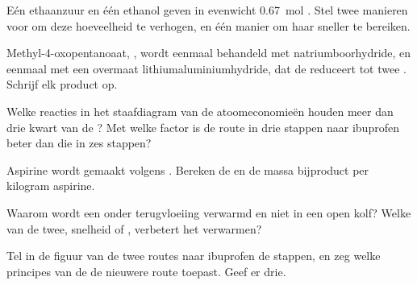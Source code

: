 \begin{exercise}[$\star\star$]\label{exo:g12:synthesis-strategy:6}
Eén  ethaanzuur en één  ethanol geven in evenwicht
\qty{0.67}{mol} . Stel twee manieren voor om deze hoeveelheid te
verhogen, en één manier om haar sneller te bereiken.
\end{exercise}

\begin{exercise}[$\star\star$]\label{exo:g12:synthesis-strategy:7}
Methyl-4-oxopentanoaat, , wordt eenmaal
behandeld met natriumboorhydride, en eenmaal met een overmaat
lithiumaluminiumhydride, dat de  reduceert tot twee .
Schrijf elk product op.
\end{exercise}

\begin{exercise}[$\star\star$]\label{exo:g12:synthesis-strategy:8}
Welke reacties in het staafdiagram van de atoomeconomieën houden meer dan
drie kwart van de ? Met welke factor is de route in drie stappen
naar ibuprofen beter dan die in zes stappen?
\end{exercise}

\begin{exercise}[$\star\star$]\label{exo:g12:synthesis-strategy:9}
Aspirine wordt gemaakt volgens .
Bereken de  en de massa bijproduct per kilogram aspirine.
\end{exercise}

\begin{exercise}[$\star\star$]\label{exo:g12:synthesis-strategy:10}
Waarom wordt een  onder terugvloeiing verwarmd en niet in een open
kolf? Welke van de twee, snelheid of , verbetert het verwarmen?
\end{exercise}

\begin{exercise}[$\star\star$]\label{exo:g12:synthesis-strategy:11}
Tel in de figuur van de twee routes naar ibuprofen de stappen, en zeg
welke principes van de  de nieuwere route toepast. Geef er
drie.
\end{exercise}

